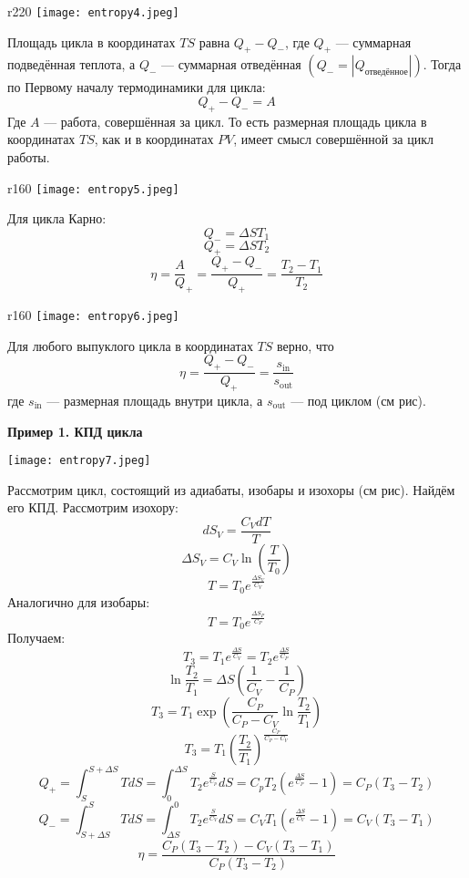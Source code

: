 \documentclass[12pt, a4paper]{article}%
\begin{document}
\begin{wrapfigure}[8]{r}{220}
\texttt{[image: entropy4.jpeg]}
\centering
\end{wrapfigure}

Площадь цикла в координатах $TS$ равна $Q_+-Q_-$, где $Q_+$ --- суммарная подведённая теплота, а $Q_-$ --- суммарная отведённая $(Q_-=|Q_{\text{отведённое}}|)$. Тогда по Первому началу  термодинамики для цикла:
\[Q_+-Q_-=A\]Где $A$ --- работа, совершённая за цикл.
То есть размерная площадь цикла в координатах $TS$, как и в координатах $PV$, имеет смысл совершённой за цикл работы.

\begin{wrapfigure}[8]{r}{160}
\texttt{[image: entropy5.jpeg]}
\centering
\end{wrapfigure}

Для цикла Карно:
\[Q_-=\Delta ST_1\]\[Q_+=\Delta ST_2\]\[
\eta =  \frac AQ_+=\frac{Q_+-Q_-}{Q_+}=\frac{T_2-T_1}{T_2}\]

\begin{wrapfigure}[8]{r}{160}
\texttt{[image: entropy6.jpeg]}
\centering
\end{wrapfigure}

Для любого выпуклого цикла в координатах $TS$ верно, что
\[\eta = \frac{Q_+-Q_-}{Q_+}=\frac{s_{\text{in}}}{s_{\text{out}}}\] где $s_{\text{in}}$ --- размерная площадь внутри цикла, а $s_{\text{out}}$ --- под циклом (см рис).

\vspace{2.5cm}

\textbf{Пример 1.  КПД цикла}


\begin{center}
\texttt{[image: entropy7.jpeg]}
\label{fig:mpr}
\end{center}


Рассмотрим цикл, состоящий из адиабаты, изобары и изохоры (см рис). Найдём его КПД.
Рассмотрим изохору:
\[dS_V=\frac{C_VdT}{T}\]\[
\Delta S_V=C_V\ln\left(\frac{T}{T_0}\right)\]\[
T=T_0e^{\frac{\Delta S_V}{C_V}}\]Аналогично для изобары:
\[T=T_0e^{\frac{\Delta S_P}{C_P}}\]Получаем:
\[T_3=T_1e^{\frac{\Delta S}{C_V}}=T_2e^{\frac{\Delta S}{C_P}}\]\[
\ln\frac{T_2}{T_1}=\Delta S\left(\frac 1{C_V}-\frac 1{C_P}\right)\]\[
T_3=T_1\exp{\left(\frac{C_P}{C_P-C_V}\ln\frac{T_2}{T_1}\right)}\]\[
T_3=T_1\left(\frac{T_2}{T_1}\right)^{\frac{C_P}{C_P-C_V}}\]\[
Q_+=\int_S^{S+\Delta S}TdS=\int_0^{\Delta S}T_2e^{\frac{S}{C_p}}dS=C_pT_2\left(e^{\frac{\Delta S}{C_P}}-1\right)=C_P(T_3-T_2)\]\[
Q_-=\int_{S+\Delta S}^{S}TdS=\int_{\Delta S}^0T_2e^{\frac{S}{C_V}}dS=C_VT_1\left(e^{\frac{\Delta S}{C_V}}-1\right)=C_V(T_3-T_1)\]\[
\eta=\frac{C_P(T_3-T_2)-C_V(T_3-T_1)}{C_P(T_3-T_2)}\]
\end{document}
